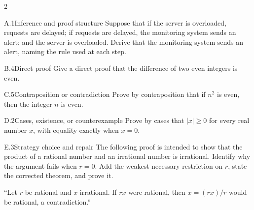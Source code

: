 \documentclass[9pt]{extarticle}
\begin{document}
\begin{multicols}{2}
\begin{CoreProblem}{A.1}{Inference and proof structure}
Suppose that if the server is overloaded, requests are delayed; if requests are
delayed, the monitoring system sends an alert; and the server is overloaded.
Derive that the monitoring system sends an alert, naming the rule used at each
step.
\end{CoreProblem}
\begin{CoreProblem}{B.4}{Direct proof}
Give a direct proof that the difference of two even integers is even.
\end{CoreProblem}
\begin{CoreProblem}{C.5}{Contraposition or contradiction}
Prove by contraposition that if $n^2$ is even, then the integer $n$ is even.
\end{CoreProblem}
\columnbreak
\begin{CoreProblem}{D.2}{Cases, existence, or counterexample}
Prove by cases that $|x|\ge 0$ for every real number $x$, with equality exactly when $x=0$.
\end{CoreProblem}
\begin{CoreProblem}{E.3}{Strategy choice and repair}
The following proof is intended to show that the product of a rational number
and an irrational number is irrational. Identify why the argument fails when
$r=0$. Add the weakest necessary restriction on $r$, state the corrected
theorem, and prove it.

``Let $r$ be rational and $x$ irrational. If $rx$ were rational, then $x=(rx)/r$ would be rational, a contradiction.''
\end{CoreProblem}
\end{multicols}
\CoreWorkArea
\FormBreak
{}
\end{document}
